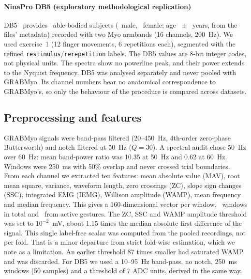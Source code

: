 \paragraph{NinaPro DB5 (exploratory methodological replication)}
DB5~\cite{pizzolato2017comparison} provides \DBFiveSubjects\ able-bodied subjects (\DBFiveMale\ male, \DBFiveFemale\ female; age \DBFiveAgeMean\ $\pm$ \DBFiveAgeSD\ years, from the files' metadata) recorded with two Myo armbands (16 channels, 200~Hz). We used exercise~1 (12 finger movements, 6 repetitions each), segmented with the refined \texttt{restimulus}/\texttt{rerepetition} labels. The DB5 values are 8-bit integer codes, not physical units. The spectra show no powerline peak, and their power extends to the Nyquist frequency. DB5 was analysed separately and never pooled with GRABMyo. Its channel numbers bear no anatomical correspondence to GRABMyo's, so only the behaviour of the procedure is compared across datasets.

\subsection{Preprocessing and features}
GRABMyo signals were band-pass filtered (20--450~Hz, 4th-order zero-phase Butterworth) and notch filtered at 50~Hz ($Q = 30$). A spectral audit chose 50~Hz over 60~Hz: mean band-power ratio was 10.35 at 50~Hz and 0.62 at 60~Hz. Windows were 250~ms with 50\% overlap and never crossed trial boundaries. From each channel we extracted ten features: mean absolute value (MAV), root mean square, variance, waveform length, zero crossings (ZC), slope sign changes (SSC), integrated EMG (IEMG), Willison amplitude (WAMP), mean frequency and median frequency. This gives a 160-dimensional vector per window, \GRABMyoWindows\ windows in total and \GRABMyoActiveWindows\ from active gestures. The ZC, SSC and WAMP amplitude threshold was set to $10^{-2}$~mV, about 1.15 times the median absolute first difference of the signal. This single label-free scalar was computed from the pooled recordings, not per fold. That is a minor departure from strict fold-wise estimation, which we note as a limitation. An earlier threshold 87 times smaller had saturated WAMP and was discarded. For DB5 we used a 10--95~Hz band-pass, no notch, 250~ms windows (50 samples) and a threshold of 7 ADC units, derived in the same way.

